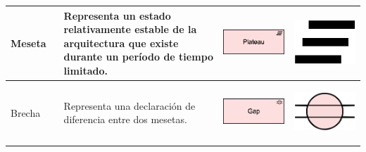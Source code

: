 \begin{longtable}{|p{0.15\linewidth}|p{0.45\linewidth}|p{0.2\linewidth} p{0.2\linewidth}|}
   Meseta
   &
   Representa un estado relativamente estable de la arquitectura que existe durante un período de tiempo limitado. 
   &
\begin{center}
   \includegraphics[width=1\linewidth]{imgs/capa_migracion/4.pdf}
\end{center} &
\begin{center}
   \includegraphics[width=0.5\linewidth]{imgs/capa_migracion/a4.pdf}
\end{center}
   \\ \hline

   Brecha
   &
   Representa una declaración de diferencia entre dos mesetas. 
   &
\begin{center}
   \includegraphics[width=1\linewidth]{imgs/capa_migracion/5.pdf}
\end{center} &
\begin{center}
   \includegraphics[width=0.5\linewidth]{imgs/capa_migracion/a5.pdf}
\end{center}
   \\ \hline

\end{longtable}
